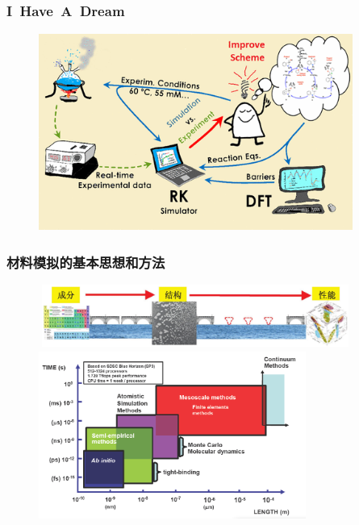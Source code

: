 \small
\frame
{
	\frametitle{\rm{I~Have~A~Dream}}
\begin{figure}[h!]
\vspace*{-0.18in}
\centering
\includegraphics[height=2.55in,width=4.05in]{Figures/Schematic_Material-Design.png}
\label{Schematic_Material-Design}
\end{figure}
}


\frame
{
	\frametitle{材料模拟的基本思想和方法}
\begin{figure}[h!]
\vspace*{-0.25in}
\centering
\includegraphics[height=0.80in,width=4.05in]{Figures/MGE-2.png}
\vskip 0.05pt
\includegraphics[height=2.20in,width=3.45in]{Figures/Multi-Scale-6.png}
\label{Multi-Scale}
\end{figure}
}

